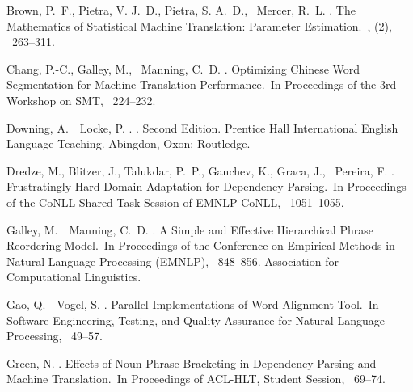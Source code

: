 \documentclass[english]{jnlp_1.4}
\begin{document}

\begin{thebibliography}{}

Brown, P.~F., Pietra, V. J.~D., Pietra, S. A.~D., \BBA\ Mercer, R.~L. \BBCP.
\newblock \BBOQ The Mathematics of Statistical Machine Translation: Parameter
  Estimation.\BBCQ\
, {}  (2), \mbox{\BPGS\
  263--311}.

Chang, P.-C., Galley, M., \BBA\ Manning, C.~D. \BBOP 2008\BBCP.
\newblock \BBOQ Optimizing {Chinese} Word Segmentation for Machine Translation
  Performance.\BBCQ\
\newblock In {\Bem Proceedings of the 3rd Workshop on SMT}, \mbox{\BPGS\
  224--232}.

Downing, A.\BBACOMMA\ \BBA\ Locke, P. \BBOP 2006\BBCP.
.
\newblock Second Edition. Prentice Hall International English Language
  Teaching. Abingdon, Oxon: Routledge.

Dredze, M., Blitzer, J., Talukdar, P.~P., Ganchev, K., Graca, J., \BBA\
  Pereira, F. \BBCP.
\newblock \BBOQ Frustratingly Hard Domain Adaptation for Dependency
  Parsing.\BBCQ\
\newblock In {\Bem Proceedings of the CoNLL Shared Task Session of
  EMNLP-CoNLL}, \mbox{\BPGS\ 1051--1055}.

Galley, M.\BBACOMMA\ \BBA\ Manning, C.~D. \BBOP 2008\BBCP.
\newblock \BBOQ A Simple and Effective Hierarchical Phrase Reordering
  Model.\BBCQ\
\newblock In {\Bem Proceedings of the Conference on Empirical Methods in
  Natural Language Processing (EMNLP)}, \mbox{\BPGS\ 848--856}. Association for
  Computational Linguistics.

Gao, Q.\BBACOMMA\ \BBA\ Vogel, S. \BBOP 2008\BBCP.
\newblock \BBOQ Parallel Implementations of Word Alignment Tool.\BBCQ\
\newblock In {\Bem Software Engineering, Testing, and Quality Assurance for
  Natural Language Processing}, \mbox{\BPGS\ 49--57}.

Green, N. \BBOP 2011\BBCP.
\newblock \BBOQ Effects of Noun Phrase Bracketing in Dependency Parsing and
  Machine Translation.\BBCQ\
\newblock In {\Bem Proceedings of ACL-HLT, Student Session}, \mbox{\BPGS\
  69--74}.


\end{thebibliography}
\end{document}
